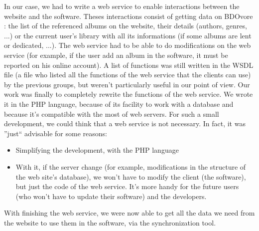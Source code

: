 \documentclass[11pt]{report} %
\begin{document}
In our case, we had to write a web service to enable interactions between the website and the software. Theses interactions consist of getting data on BDOvore : the list of the referenced albums on the website, their details (authors, genres, ...) or the current user's library with all its informations (if some albums are lent or dedicated, ...). The web service had to be able to do modifications on the web service (for example, if the user add an album in the software, it must be reported on his online account).
\newline A list of functions was still written in the WSDL file (a file who listed all the functions of the web service that the clients can use) by the previous groups, but weren't particularly useful in our point of view.
\newline Our work was finally to completely rewrite the functions of the web service. We wrote it in the PHP language, because of its facility to work with a database and because it's compatible with the most of web servers.
\newline For such a small development, we could think that a web service is not necessary. In fact, it was ''just`` advisable for some reasons:

\begin{itemize}
\item Simplifying the development, with the PHP language 
\item With it, if the server change (for example, modifications in the structure of the web site's database), we won't have to modify the client (the software), but just the code of the web service. It's more handy for the future users (who won't have to update their software) and the developers. 
\end{itemize}

With finishing the web service, we were now able to get all the data we need from the website to use them in the software, via the synchronization tool.
\end{document}
